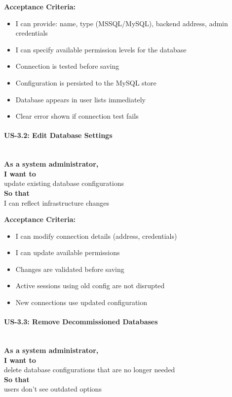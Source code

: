 \noindent\textbf{Acceptance Criteria:}
\begin{itemize}
    \item I can provide: name, type (MSSQL/MySQL), backend address, admin credentials
    \item I can specify available permission levels for the database
    \item Connection is tested before saving
    \item Configuration is persisted to the MySQL store
    \item Database appears in user lists immediately
    \item Clear error shown if connection test fails
\end{itemize}

\paragraph{US-3.2: Edit Database Settings}
\mbox{}\\[0.5em]

\noindent\textbf{As a system administrator,} \\
\textbf{I want to} \\
update existing database configurations \\
\textbf{So that} \\
I can reflect infrastructure changes

\noindent\textbf{Acceptance Criteria:}
\begin{itemize}
    \item I can modify connection details (address, credentials)
    \item I can update available permissions
    \item Changes are validated before saving
    \item Active sessions using old config are not disrupted
    \item New connections use updated configuration
\end{itemize}

\paragraph{US-3.3: Remove Decommissioned Databases}
\mbox{}\\[0.5em]

\noindent\textbf{As a system administrator,} \\
\textbf{I want to} \\
delete database configurations that are no longer needed \\
\textbf{So that} \\
users don't see outdated options

